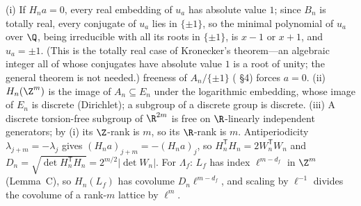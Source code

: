 (i) If $H_na=0$, every real embedding of $u_a$ has absolute value $1$; since $B_n$ is totally real, every conjugate of $u_a$ lies in $\{\pm1\}$, so the minimal polynomial of $u_a$ over $\Q$, being irreducible with all its roots in $\{\pm1\}$, is $x-1$ or $x+1$, and $u_a=\pm1$. (This is the totally real case of Kronecker's theorem---an algebraic integer all of whose conjugates have absolute value $1$ is a root of unity; the general theorem is not needed.) freeness of $A_n/\{\pm1\}$ (\cite{KY} \S4) forces $a=0$. (ii) $H_n(\Z^m)$ is the image of $A_n\subseteq E_n$ under the logarithmic embedding, whose image of $E_n$ is discrete (Dirichlet); a subgroup of a discrete group is discrete. (iii) A discrete torsion-free subgroup of $\R^{2m}$ is free on $\R$-linearly independent generators; by (i) its $\Z$-rank is $m$, so its $\R$-rank is $m$. Antiperiodicity $\lambda_{j+m}=-\lambda_j$ gives $(H_na)_{j+m}=-(H_na)_j$, so $H_n^{\mathsf T}H_n=2W_n^{\mathsf T}W_n$ and $D_n=\sqrt{\det H_n^{\mathsf T}H_n}=2^{m/2}|\det W_n|$. For $\Lambda_f$: $L_f$ has index $\ell^{m-d_f}$ in $\Z^m$ (Lemma~C), so $H_n(L_f)$ has covolume $D_n\ell^{m-d_f}$, and scaling by $\ell^{-1}$ divides the covolume of a rank-$m$ lattice by $\ell^m$.
